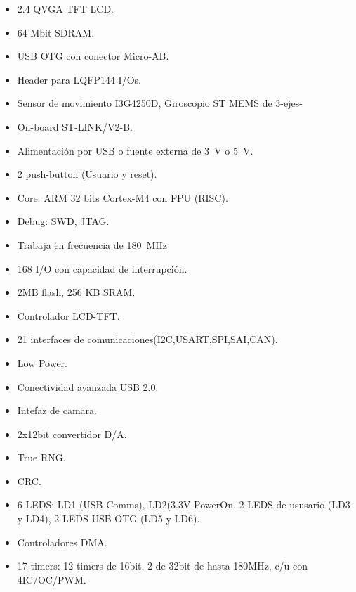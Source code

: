 \begin{multicols}{2}
 \begin{itemize}
    \item 2.4 QVGA TFT LCD.
    \item 64-Mbit SDRAM.
    \item USB OTG con conector Micro-AB.
    \item Header para LQFP144 I/Os.
    \item Sensor de movimiento I3G4250D, Giroscopio ST MEMS de 3-ejes-
    \item On-board ST-LINK/V2-B.
    \item Alimentación por USB o fuente externa de \SI{3}{\volt} o \SI{5}{\volt}.
    \item 2  push-button (Usuario y reset).
    \item Core: ARM 32 bits Cortex-M4 con FPU (RISC).
    \item Debug: SWD, JTAG.
    \item Trabaja en frecuencia de \SI{180}{\mega\Hz}
    \item 168 I/O con capacidad de interrupción.
    \item 2MB flash, 256 KB SRAM.
    \item Controlador LCD-TFT.
    \item 21 interfaces de comunicaciones(I2C,USART,SPI,SAI,CAN).
    \item Low Power.
    \item Conectividad avanzada USB 2.0.
    \item Intefaz de camara.
    \item 2x12bit convertidor D/A.
    \item True RNG.
    \item CRC.
    \item 6 LEDS: LD1 (USB Comms), LD2(3.3V PowerOn, 2 LEDS de ususario (LD3 y LD4), 2 LEDS USB OTG (LD5 y LD6).
    \item Controladores DMA.
    \item 17 timers: 12 timers de 16bit, 2 de 32bit de hasta 180MHz, c/u con 4IC/OC/PWM.
\end{itemize}   
\end{multicols}

